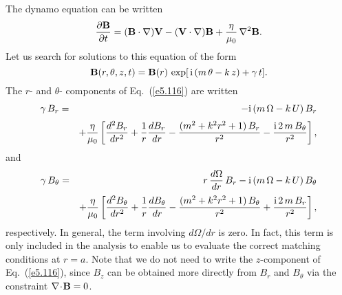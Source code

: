The dynamo equation can be written
\begin{equation}\label{e5.116}
\frac{\partial{\bf B}}{\partial t} = ({\bf B}\cdot\nabla){\bf V}
-({\bf V}\cdot\nabla){\bf B} + \frac{\eta}{\mu_0}\,\nabla^2{\bf B}.
\end{equation}
Let us search for solutions to this equation of the form
\begin{equation}
{\bf B}(r,\theta,z,t) = {\bf B}(r)\,\exp[\,{\rm i}\,(m\,\theta -k\, z)+\gamma\,t].
\end{equation}
The $r$- and $\theta$- components of Eq.~(\ref{e5.116}) are written
\begin{eqnarray}\label{e5.118}
\gamma\,B_r &=& -{\rm i}\,(m\,{\Omega}-k \,U)\,B_r \\[0.5ex]
&&+ \frac{\eta}{\mu_0}
\left[\frac{d^2 B_r}{dr^2} + \frac{1}{r}\frac{dB_r}{dr} - \frac{(m^2+k^2 r^2
+1)\,B_r}{r^2}- \frac{{\rm i}\,2\,m\,B_\theta}{r^2}\right],\nonumber
\end{eqnarray}
and
\begin{eqnarray}\label{e5.119}
\gamma\,B_\theta& = &r\,\frac{d{\Omega}}{dr}\,B_r
-{\rm i}\,(m\,{\Omega}-k\, U)\,B_\theta\\[0.5ex]
&&+ \frac{\eta}{\mu_0}
\left[\frac{d^2 B_\theta}{dr^2} + \frac{1}{r}\frac{dB_\theta}{dr} -
 \frac{(m^2+k^2 r^2
+1)\,B_\theta}{r^2}+ \frac{{\rm i}\,2\,m\,B_r}{r^2}\right],\nonumber
\end{eqnarray}
respectively. In general, the term involving $d{\Omega}/dr$
is zero. In fact, this term is only included in the analysis to enable 
us to evaluate the correct matching conditions at $r=a$. Note that we do not need to
write the $z$-component of Eq.~(\ref{e5.116}), since $B_z$ can be obtained 
more directly from $B_r$
and $B_\theta$ via the constraint $\nabla\!\cdot\!{\bf B} = 0$.  

